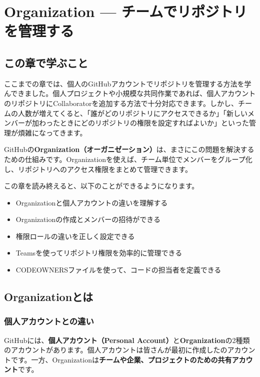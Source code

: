 \chapter{Organization --- チームでリポジトリを管理する}

\section{この章で学ぶこと}

ここまでの章では、個人のGitHubアカウントでリポジトリを管理する方法を学んできました。個人プロジェクトや小規模な共同作業であれば、個人アカウントのリポジトリにCollaboratorを追加する方法で十分対応できます。しかし、チームの人数が増えてくると、「誰がどのリポジトリにアクセスできるか」「新しいメンバーが加わったときにどのリポジトリの権限を設定すればよいか」といった管理が煩雑になってきます。

GitHubの\textbf{Organization（オーガニゼーション）}は、まさにこの問題を解決するための仕組みです。Organizationを使えば、チーム単位でメンバーをグループ化し、リポジトリへのアクセス権限をまとめて管理できます。

この章を読み終えると、以下のことができるようになります。

\begin{itemize}
  \item Organizationと個人アカウントの違いを理解する
  \item Organizationの作成とメンバーの招待ができる
  \item 権限ロールの違いを正しく設定できる
  \item Teamsを使ってリポジトリ権限を効率的に管理できる
  \item CODEOWNERSファイルを使って、コードの担当者を定義できる
\end{itemize}

\section{Organizationとは}

\subsection{個人アカウントとの違い}

GitHubには、\textbf{個人アカウント（Personal Account）}と\textbf{Organization}の2種類のアカウントがあります。個人アカウントは皆さんが最初に作成したのアカウントです。一方、Organizationは\textbf{チームや企業、プロジェクトのための共有アカウント}です。

